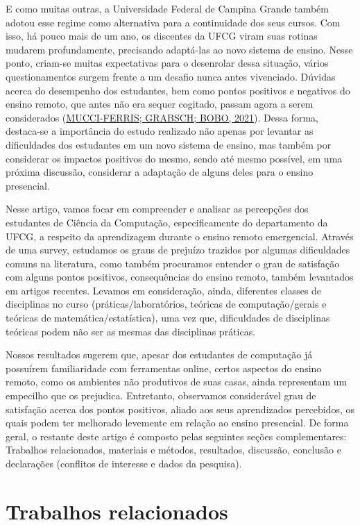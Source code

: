 \documentclass[
  12pt,
  portuguese,
]{article}
\begin{document}
E como muitas outras, a Universidade Federal de Campina Grande também
adotou esse regime como alternativa para a continuidade dos seus cursos.
Com isso, há pouco mais de um ano, os discentes da UFCG viram suas
rotinas mudarem profundamente, precisando adaptá-las ao novo sistema de
ensino. Nesse ponto, criam-se muitas expectativas para o desenrolar
dessa situação, vários questionamentos surgem frente a um desafio nunca
antes vivenciado. Dúvidas acerca do desempenho dos estudantes, bem como
pontos positivos e negativos do ensino remoto, que antes não era sequer
cogitado, passam agora a serem considerados
(\protect\hyperlink{ref-positives}{MUCCI-FERRIS; GRABSCH; BOBO, 2021}).
Dessa forma, destaca-se a importância do estudo realizado não apenas por
levantar as dificuldades dos estudantes em um novo sistema de ensino,
mas também por considerar os impactos positivos do mesmo, sendo até
mesmo possível, em uma próxima discussão, considerar a adaptação de
alguns deles para o ensino presencial.

Nesse artigo, vamos focar em compreender e analisar as percepções dos
estudantes de Ciência da Computação, especificamente do departamento da
UFCG, a respeito da aprendizagem durante o ensino remoto emergencial.
Através de uma survey, estudamos os graus de prejuízo trazidos por
algumas dificuldades comuns na literatura, como também procuramos
entender o grau de satisfação com alguns pontos positivos, consequências
do ensino remoto, também levantados em artigos recentes. Levamos em
consideração, ainda, diferentes classes de disciplinas no curso
(práticas/laboratórios, teóricas de computação/gerais e teóricas de
matemática/estatística), uma vez que, dificuldades de disciplinas
teóricas podem não ser as mesmas das disciplinas práticas.

Nossos resultados sugerem que, apesar dos estudantes de computação já
possuírem familiaridade com ferramentas online, certos aspectos do
ensino remoto, como os ambientes não produtivos de suas casas, ainda
representam um empecilho que os prejudica. Entretanto, observamos
considerável grau de satisfação acerca dos pontos positivos, aliado aos
seus aprendizados percebidos, os quais podem ter melhorado levemente em
relação ao ensino presencial. De forma geral, o restante deste artigo é
composto pelas seguintes seções complementares: Trabalhos relacionados,
materiais e métodos, resultados, discussão, conclusão e declarações
(conflitos de interesse e dados da pesquisa).

\hypertarget{trabalhos-relacionados}{%
\section{Trabalhos relacionados}\label{trabalhos-relacionados}}
\end{document}
